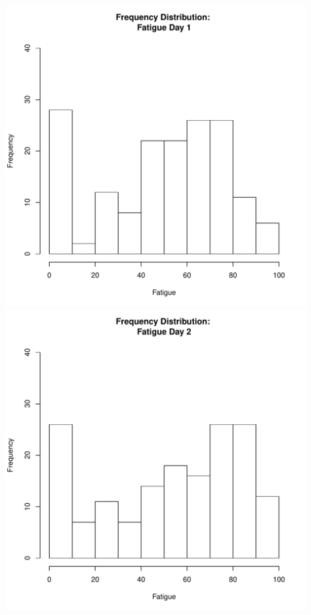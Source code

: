 \documentclass[12pt]{report}
\begin{document}

\clearpage
\includegraphics[scale =.4]{../images/distFatigueDay1.pdf}
\includegraphics[scale =.4]{../images/distFatigueDay2.pdf}
\end{document}
